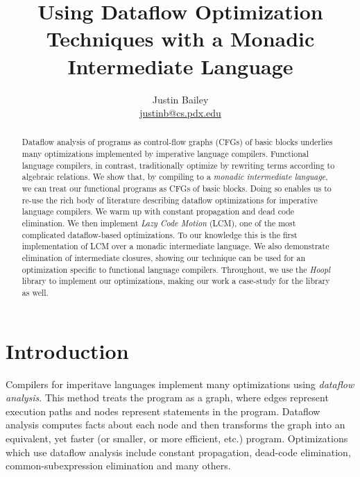 \documentclass[12pt]{report}
\makeatletter
\newcommand{\authorEmail}{\url{justinb@cs.pdx.edu}}
\makeatother
\begin{document}
\date{}
\author{Justin Bailey \\ \authorEmail}
\title{Using Dataflow Optimization Techniques with a Monadic Intermediate Language}

\VerbatimFootnotes
\DefineShortVerb{\#}
\doublespacing

\maketitle

\renewcommand{\abstractnamefont}{\normalfont\small\sffamily\bfseries}
\begin{abstract}
  Dataflow analysis of programs as control-flow graphs (CFGs) of basic
  blocks underlies many optimizations implemented by imperative
  language compilers. Functional language compilers, in contrast,
  traditionally optimize by rewriting terms according to algebraic
  relations. We show that, by compiling to a \emph{monadic
    intermediate language}, we can treat our functional programs as
  CFGs of basic blocks. Doing so enables us to re-use the rich body of
  literature describing dataflow optimizations for imperative language
  compilers. We warm up with constant propagation and dead code
  elimination. We then implement \emph{Lazy Code Motion} (LCM), one of
  the most complicated dataflow-based optimizations. To our knowledge this
  is the first implementation of LCM over a monadic intermediate
  language. We also demonstrate elimination of intermediate closures,
  showing our technique can be used for an optimization specific to
  functional language compilers.  Throughout, we use the \emph{Hoopl}
  library to implement our optimizations, making our work a case-study
  for the library as well.
\end{abstract}

\chapter{Introduction}

Compilers for imperitave languages implement many optimizations using
\emph{dataflow analysis}. This method treats the program as a graph,
where edges represent execution paths and nodes represent statements
in the program. Dataflow analysis computes facts about each node and
then transforms the graph into an equivalent, yet faster (or smaller,
or more efficient, etc.) program. Optimizations which use dataflow
analysis include constant propagation, dead-code elimination,
common-subexpression elimination and many others.
\end{document}
